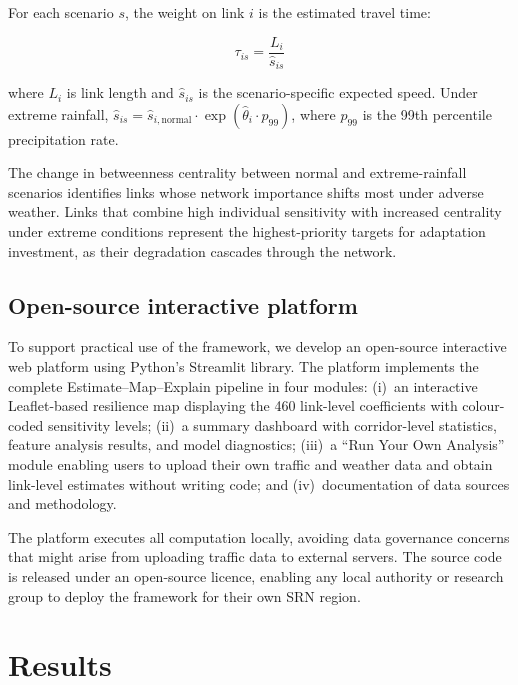 \documentclass[review]{elsarticle}
\begin{document}
For each scenario $s$, the weight on link $i$ is the estimated travel time:

\begin{equation}
\label{eq:traveltime}
\tau_{is} = \frac{L_i}{\hat{s}_{is}}
\end{equation}

\noindent where $L_i$ is link length and $\hat{s}_{is}$ is the scenario-specific expected speed. Under extreme rainfall, $\hat{s}_{is} = \hat{s}_{i,\text{normal}} \cdot \exp(\hat{\theta}_i \cdot p_{99})$, where $p_{99}$ is the 99th percentile precipitation rate.

The change in betweenness centrality between normal and extreme-rainfall scenarios identifies links whose network importance shifts most under adverse weather. Links that combine high individual sensitivity with increased centrality under extreme conditions represent the highest-priority targets for adaptation investment, as their degradation cascades through the network.


\subsection{Open-source interactive platform}
\label{sec:method:platform}

To support practical use of the framework, we develop an open-source interactive web platform using Python's Streamlit library. The platform implements the complete Estimate--Map--Explain pipeline in four modules: (i)~an interactive Leaflet-based resilience map displaying the 460 link-level coefficients with colour-coded sensitivity levels; (ii)~a summary dashboard with corridor-level statistics, feature analysis results, and model diagnostics; (iii)~a ``Run Your Own Analysis'' module enabling users to upload their own traffic and weather data and obtain link-level estimates without writing code; and (iv)~documentation of data sources and methodology.

The platform executes all computation locally, avoiding data governance concerns that might arise from uploading traffic data to external servers. The source code is released under an open-source licence, enabling any local authority or research group to deploy the framework for their own SRN region.


\section{Results}
\label{sec:results}
\end{document}
